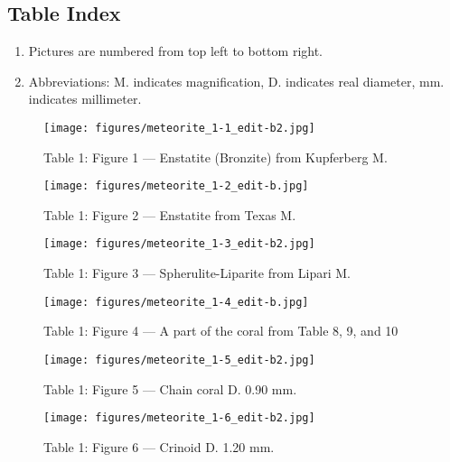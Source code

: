 \documentclass[a4paper, 12pt, oneside]{article}
\begin{document}
\subsection{Table Index}
\begin{enumerate}
    \item Pictures are numbered from top left to bottom right.
    \item Abbreviations: M. indicates magnification, D. indicates real diameter, mm. indicates millimeter.
\end{enumerate}
\clearpage
\pagestyle{fancy}
\fancyhf{}
\cfoot{\thepage}
\begin{figure}[b]
\texttt{[image: figures/meteorite\_1-1\_edit-b2.jpg]}
\caption{Table 1: Figure 1 --- Enstatite (Bronzite) from Kupferberg M.}
\centering
\end{figure}
\clearpage
\begin{figure}[t]
\texttt{[image: figures/meteorite\_1-2\_edit-b.jpg]}
\caption{Table 1: Figure 2 --- Enstatite from Texas M.}
\centering
\end{figure}
\clearpage
\begin{figure}[t]
\texttt{[image: figures/meteorite\_1-3\_edit-b2.jpg]}
\caption{Table 1: Figure 3 --- Spherulite-Liparite from Lipari M.}
\centering
\end{figure}
\clearpage
\begin{figure}[t]
\texttt{[image: figures/meteorite\_1-4\_edit-b.jpg]}
\caption{Table 1: Figure 4 --- A part of the coral from Table 8, 9, and 10}
\centering
\end{figure}
\clearpage
\begin{figure}[t]
\texttt{[image: figures/meteorite\_1-5\_edit-b2.jpg]}
\caption{Table 1: Figure 5 --- Chain coral D. 0.90 mm.}
\centering
\end{figure}
\clearpage
\begin{figure}[t]
\texttt{[image: figures/meteorite\_1-6\_edit-b2.jpg]}
\caption{Table 1: Figure 6 --- Crinoid D. 1.20 mm.}
\centering
\end{figure}
\end{document}
